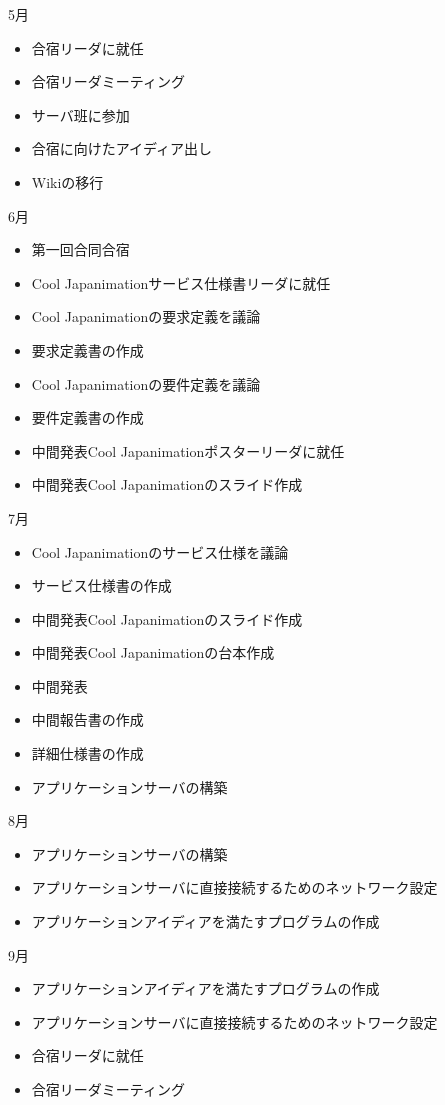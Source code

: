 5月
\begin{itemize}
\item 合宿リーダに就任
\item 合宿リーダミーティング
\item サーバ班に参加
\item 合宿に向けたアイディア出し
\item Wikiの移行
\end{itemize}
6月
\begin{itemize}
\item 第一回合同合宿
\item Cool Japanimationサービス仕様書リーダに就任
\item Cool Japanimationの要求定義を議論
\item 要求定義書の作成
\item Cool Japanimationの要件定義を議論
\item 要件定義書の作成
\item 中間発表Cool Japanimationポスターリーダに就任
\item 中間発表Cool Japanimationのスライド作成
\end{itemize}
7月
\begin{itemize}
\item Cool Japanimationのサービス仕様を議論
\item サービス仕様書の作成
\item 中間発表Cool Japanimationのスライド作成
\item 中間発表Cool Japanimationの台本作成
\item 中間発表
\item 中間報告書の作成
\item 詳細仕様書の作成
\item アプリケーションサーバの構築
\end{itemize}
8月
\begin{itemize}
\item アプリケーションサーバの構築 
\item アプリケーションサーバに直接接続するためのネットワーク設定
\item アプリケーションアイディアを満たすプログラムの作成
\end{itemize}
9月
\begin{itemize}
\item アプリケーションアイディアを満たすプログラムの作成
\item アプリケーションサーバに直接接続するためのネットワーク設定
\item 合宿リーダに就任
\item 合宿リーダミーティング
\end{itemize}
